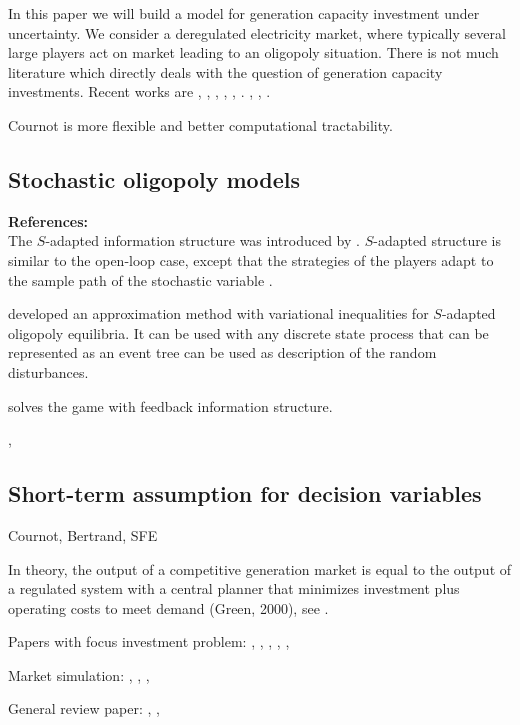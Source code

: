 In this paper we will build a model for generation capacity investment under uncertainty. We consider a deregulated electricity market, where typically several large players act on market leading to an oligopoly situation. There is not much literature which directly deals with the question of  generation capacity investments. Recent works are \cite{Chuang2001}, \cite{Ventosa2002}, \cite{Chaton2003}, \cite{Hogendorn2003}, \cite{Pineau2003}, \cite{Ehrenmann2004}. \cite{Murphy2005}, \cite{Kiesling2007}, \cite{Pineau2007}.


Cournot is more flexible and better computational tractability.


\subsection{Stochastic oligopoly models}

\textbf{References:} \cite{Salant1982, Wolf1997, Haurie2002, Pineau2003, Murto2004}\\


The $S$-adapted information structure was introduced by \cite{Haurie1990}.
$S$-adapted structure is similar to the open-loop case, except that the strategies of the players adapt to the sample path of the stochastic variable \citep[see][pg. 128]{Pineau2003}.

\cite{Haurie2002} developed an approximation method with variational inequalities for $S$-adapted oligopoly equilibria. It can be used with any discrete state process that can be represented as an event tree can be used as description of the random disturbances.

\cite{Murto2004} solves the game with feedback information structure.

\cite{Haurie2001}, \cite{Genc2007}

\subsection{Short-term assumption for decision variables}

Cournot, Bertrand, SFE


In theory, the output of a competitive generation market is equal to the output of a regulated system with a central planner that minimizes investment plus operating costs to meet demand (Green, 2000), see \citep[see][pg. 111]{Rothwell2003}.

Papers with focus investment problem: \cite{Pineau2003}, \cite{Murphy2005}, \cite{Genc2007}, \cite{Kiesling2007}, \cite{Barmack2007}, \cite{Sauma2006}

Market simulation: \cite{Torre2003}, \cite{Valenzuela2007}, \cite{Hobbs2001},\cite{Otero-Novas2000}

General review paper: \cite{Neuhoff2005}, \cite{Ventosa2005}, \cite{Kahn1998}

